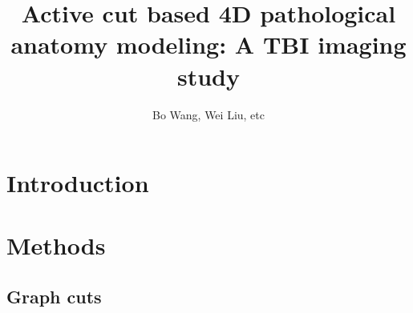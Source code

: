 \documentclass{article}
\author{Bo Wang, Wei Liu, etc}
\title{Active cut based 4D pathological anatomy modeling:
 A TBI imaging study}
\begin{document}
\maketitle
\begin{abstract}
\end{abstract}

\section{Introduction}
\section{Methods}
\subsection{Graph cuts}



\end{document}
